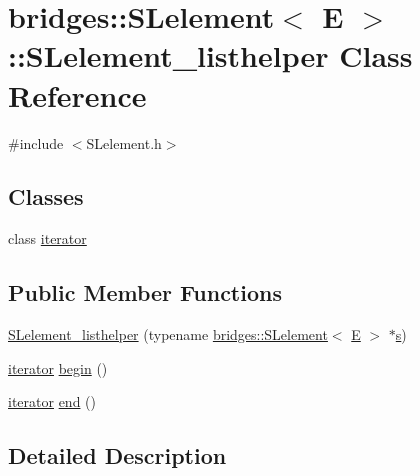 \hypertarget{classbridges_1_1_s_lelement_1_1_s_lelement__listhelper}{}\section{bridges\+::S\+Lelement$<$ E $>$\+::S\+Lelement\+\_\+listhelper Class Reference}
\label{classbridges_1_1_s_lelement_1_1_s_lelement__listhelper}


{\ttfamily \#include $<$S\+Lelement.\+h$>$}

\subsection*{Classes}
\begin{DoxyCompactItemize}
\item 
class \mbox{\hyperlink{classbridges_1_1_s_lelement_1_1_s_lelement__listhelper_1_1iterator}{iterator}}
\end{DoxyCompactItemize}
\subsection*{Public Member Functions}
\begin{DoxyCompactItemize}
\item 
\mbox{\hyperlink{classbridges_1_1_s_lelement_1_1_s_lelement__listhelper_a8185563b272397f9db1694577e3a110e}{S\+Lelement\+\_\+listhelper}} (typename \mbox{\hyperlink{classbridges_1_1_s_lelement}{bridges\+::\+S\+Lelement}}$<$ \mbox{\hyperlink{namespacebridges_acfb0a4f7877d8f63de3e6862004c50eda3a3ea00cfc35332cedf6e5e9a32e94da}{E}} $>$ $\ast$\mbox{\hyperlink{namespacebridges_acfb0a4f7877d8f63de3e6862004c50eda03c7c0ace395d80182db07ae2c30f034}{s}})
\item 
\mbox{\hyperlink{classbridges_1_1_s_lelement_1_1_s_lelement__listhelper_1_1iterator}{iterator}} \mbox{\hyperlink{classbridges_1_1_s_lelement_1_1_s_lelement__listhelper_a62443bbcdabeba6dc3a784f84375bc32}{begin}} ()
\item 
\mbox{\hyperlink{classbridges_1_1_s_lelement_1_1_s_lelement__listhelper_1_1iterator}{iterator}} \mbox{\hyperlink{classbridges_1_1_s_lelement_1_1_s_lelement__listhelper_ac3adfea9337ba2f237a667794e41a975}{end}} ()
\end{DoxyCompactItemize}


\subsection{Detailed Description}

